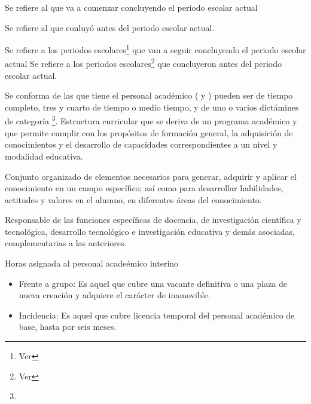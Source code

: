\begin{bGlosario}
 	 Se refiere al  que va a comenzar concluyendo el periodo escolar actual
 	
 	 Se refiere al  que conluyó antes del periodo escolar actual.

	 Se refiere a los periodos escolares\footnote{Ver } que van a seguir concluyendo el periodo escolar actual
	 Se refiere a los periodos escolares\footnote{Ver } que concluyeron antes del periodo escolar actual.
	
	 Se conforma de las  que tiene el personal académico ( y ) pueden ser de tiempo completo, tres y cuarto de tiempo o medio tiempo, y de uno o varios dictámines de categoría \footnote{ }.
	 Estructura curricular que se deriva de un programa académico y que permite cumplir con los propósitos de formación general, la adquisición de conocimientos y el desarrollo de capacidades correspondientes a un nivel y modalidad educativa.%
	
	 Conjunto organizado de elementos necesarios para generar, adquirir y aplicar	el conocimiento en un campo específico; así como para desarrollar habilidades, actitudes y valores en el alumno, en diferentes áreas del conocimiento. %
	
	 Responsable de las funciones específicas de docencia, de investigación científica y tecnológica, desarrollo tecnológico e investigación educativa y demás asociadas, complementarias a las anteriores.
	
	 Horas asignada al personal acadeémico interino
	\begin{itemize}
		\item Frente a grupo: Es aquel que cubre una vacante definitiva o una plaza de nueva
		creación y adquiere el carácter de inamovible.
		\item Incidencia: Es aquel que cubre licencia temporal del personal académico de
		base, hasta por seis meses.
	\end{itemize}
	

\end{bGlosario}
